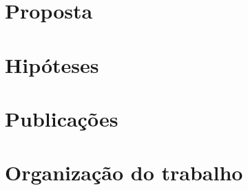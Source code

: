 \acresetall
\section{Proposta}
\section{Hipóteses}
\section{Publicações}
\section{Organização do trabalho}

